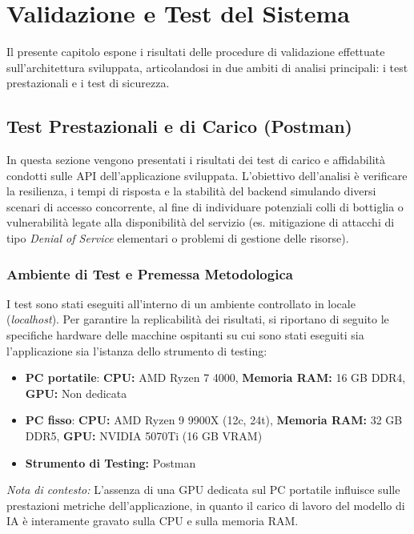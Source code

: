 \chapter{Validazione e Test del Sistema}

Il presente capitolo espone i risultati delle procedure di validazione effettuate sull'architettura sviluppata, articolandosi in due ambiti di analisi principali: i test prestazionali e i test di sicurezza.

\section{Test Prestazionali e di Carico (Postman)}

In questa sezione vengono presentati i risultati dei test di carico e affidabilità condotti sulle API dell'applicazione sviluppata. L'obiettivo dell'analisi è verificare la resilienza, i tempi di risposta e la stabilità del backend simulando diversi scenari di accesso concorrente, al fine di individuare potenziali colli di bottiglia o vulnerabilità legate alla disponibilità del servizio (es. mitigazione di attacchi di tipo \textit{Denial of Service} elementari o problemi di gestione delle risorse).

\subsection{Ambiente di Test e Premessa Metodologica}
I test sono stati eseguiti all'interno di un ambiente controllato in locale (\textit{localhost}). Per garantire la replicabilità dei risultati, si riportano di seguito le specifiche hardware delle macchine ospitanti su cui sono stati eseguiti sia l'applicazione sia l'istanza dello strumento di testing:

\begin{itemize}
    \item \textbf{PC portatile}: \textbf{CPU:} AMD Ryzen 7 4000, \textbf{Memoria RAM:} 16 GB DDR4, \textbf{GPU:} Non dedicata 
    \item \textbf{PC fisso}: \textbf{CPU:} AMD Ryzen 9 9900X (12c, 24t), \textbf{Memoria RAM:} 32 GB DDR5, \textbf{GPU:} NVIDIA 5070Ti (16 GB VRAM) 
    \item \textbf{Strumento di Testing:} Postman
\end{itemize}

\textit{Nota di contesto:} L'assenza di una GPU dedicata sul PC portatile influisce sulle prestazioni metriche dell'applicazione, in quanto il carico di lavoro del modello di IA è interamente gravato sulla CPU e sulla memoria RAM.

